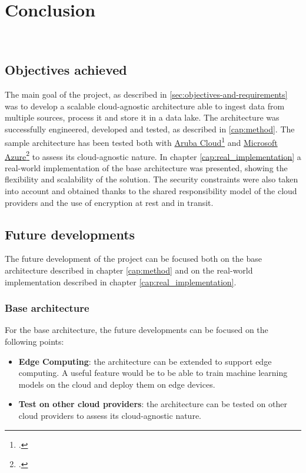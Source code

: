 \chapter{Conclusion}
\label{cap:conclusion}

\\

\section{Objectives achieved}
The main goal of the project, as described in \ref{sec:objectives-and-requirements} was to develop a scalable cloud-agnostic architecture able to ingest data from multiple sources, process it and store it in a data lake. The architecture was successfully engineered, developed and tested, as described in \ref{cap:method}. The sample architecture has been tested both with \href{https://www.arubacloud.com/}{Aruba Cloud}\footcite{site:aruba-cloud} and \href{https://azure.microsoft.com/it-it/}{Microsoft Azure}\footcite{site:azure} to assess its cloud-agnostic nature.
In chapter \ref{cap:real_implementation} a real-world implementation of the base architecture was presented, showing the flexibility and scalability of the solution. The security constraints were also taken into account and obtained thanks to the shared responsibility model of the cloud providers and the use of encryption at rest and in transit.\\

\section{Future developments}
The future development of the project can be focused both on the base architecture described in chapter \ref{cap:method} and on the real-world implementation described in chapter \ref{cap:real_implementation}.

\subsection{Base architecture}
For the base architecture, the future developments can be focused on the following points:
\begin{itemize}
    \item \textbf{Edge Computing}: the architecture can be extended to support edge computing. A useful feature would be to be able to train machine learning models on the cloud and deploy them on edge devices.
    \item \textbf{Test on other cloud providers}: the architecture can be tested on other cloud providers to assess its cloud-agnostic nature.
\end{itemize}



